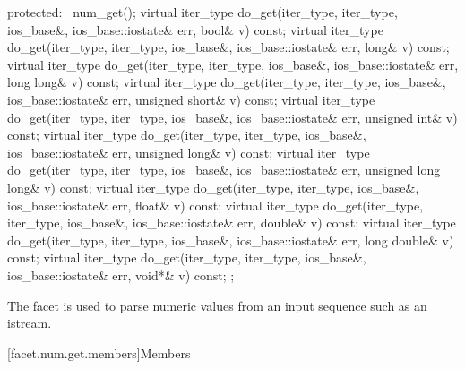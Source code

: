 \begin{codeblock}
{{    protected:
      ~num_get();
      virtual iter_type do_get(iter_type, iter_type, ios_base&,
                               ios_base::iostate& err, bool& v) const;
      virtual iter_type do_get(iter_type, iter_type, ios_base&,
                               ios_base::iostate& err, long& v) const;
      virtual iter_type do_get(iter_type, iter_type, ios_base&,
                               ios_base::iostate& err, long long& v) const;
      virtual iter_type do_get(iter_type, iter_type, ios_base&,
                               ios_base::iostate& err, unsigned short& v) const;
      virtual iter_type do_get(iter_type, iter_type, ios_base&,
                               ios_base::iostate& err, unsigned int& v) const;
      virtual iter_type do_get(iter_type, iter_type, ios_base&,
                               ios_base::iostate& err, unsigned long& v) const;
      virtual iter_type do_get(iter_type, iter_type, ios_base&,
                               ios_base::iostate& err, unsigned long long& v) const;
      virtual iter_type do_get(iter_type, iter_type, ios_base&,
                               ios_base::iostate& err, float& v) const;
      virtual iter_type do_get(iter_type, iter_type, ios_base&,
                               ios_base::iostate& err, double& v) const;
      virtual iter_type do_get(iter_type, iter_type, ios_base&,
                               ios_base::iostate& err, long double& v) const;
      virtual iter_type do_get(iter_type, iter_type, ios_base&,
                               ios_base::iostate& err, void*& v) const;
    };
}
\end{codeblock}

\pnum
The facet  is used to parse numeric values
from an input sequence such as an istream.

[facet.num.get.members]{Members}


